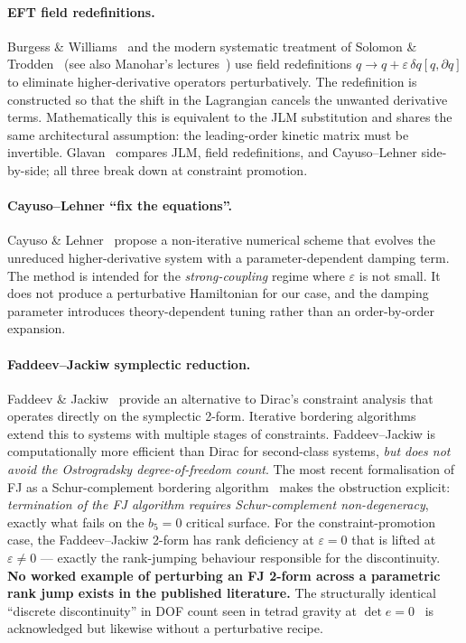 \paragraph{EFT field redefinitions.}
Burgess \& Williams~\cite{BurgessWilliams2014} and the modern systematic
treatment of Solomon \& Trodden~\cite{SolomonTrodden2018} (see also
Manohar's lectures~\cite{Manohar2018}) use field redefinitions
$q \to q + \varepsilon\,\delta q[q, \partial q]$ to eliminate higher-derivative
operators perturbatively.  The redefinition is constructed so that the
shift in the Lagrangian cancels the unwanted derivative terms.
Mathematically this is equivalent to the JLM substitution and shares the
same architectural assumption: the leading-order kinetic matrix must be
invertible.  Glavan~\cite{Glavan2018} compares JLM, field redefinitions,
and Cayuso--Lehner side-by-side; all three break down at constraint
promotion.

\paragraph{Cayuso--Lehner ``fix the equations''.}
Cayuso \& Lehner~\cite{CayusoLehner2017} propose a non-iterative numerical
scheme that evolves the unreduced higher-derivative system with a
parameter-dependent damping term.  The method is intended for the
\emph{strong-coupling} regime where $\varepsilon$ is not small.  It does
not produce a perturbative Hamiltonian for our case, and the damping
parameter introduces theory-dependent tuning rather than an order-by-order
expansion.

\paragraph{Faddeev--Jackiw symplectic reduction.}
Faddeev \& Jackiw~\cite{FaddeevJackiw1988} provide an alternative to
Dirac's constraint analysis that operates directly on the symplectic
2-form.  Iterative bordering algorithms~\cite{DiazSaldivia2025} extend
this to systems with multiple stages of constraints.  Faddeev--Jackiw
is computationally more efficient than Dirac for second-class systems,
\emph{but does not avoid the Ostrogradsky degree-of-freedom count}.
The most recent formalisation of FJ as a Schur-complement bordering
algorithm~\cite{CaboBizetBartocci2026} makes the obstruction explicit:
\emph{termination of the FJ algorithm requires Schur-complement
non-degeneracy}, exactly what fails on the $b_5 = 0$ critical surface.
For the constraint-promotion case, the Faddeev--Jackiw 2-form has rank
deficiency at $\varepsilon = 0$ that is lifted at $\varepsilon \ne 0$ ---
exactly the rank-jumping behaviour responsible for the discontinuity.
\textbf{No worked example of perturbing an FJ 2-form across a parametric
rank jump exists in the published literature.}  The structurally identical
``discrete discontinuity'' in DOF count seen in tetrad gravity at
$\det e = 0$~\cite{ChiouGeillerWang2022} is acknowledged but likewise
without a perturbative recipe.


